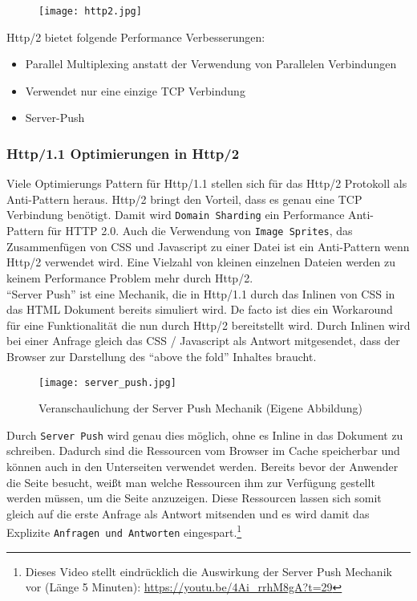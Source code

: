 		\begin{figure}[htbp]
			\begin{center}
				\texttt{[image: http2.jpg]}
				\label{fig:http2}
			\end{center}
		\end{figure}

		Http/2 bietet folgende Performance Verbesserungen:

		\begin{itemize}
			\item Parallel Multiplexing anstatt der Verwendung von Parallelen Verbindungen
			\item Verwendet nur eine einzige TCP Verbindung
			\item Server-Push
		\end{itemize}
		
		\subsubsection{Http/1.1 Optimierungen in Http/2} %
		\label{ssub:http_1_1_optimierungen_in_http_2}
			Viele Optimierungs Pattern für Http/1.1 stellen sich für das Http/2 Protokoll als Anti-Pattern heraus. Http/2 bringt den Vorteil, dass es genau eine TCP Verbindung benötigt. Damit wird \texttt{Domain Sharding} ein Performance Anti-Pattern für HTTP 2.0. Auch die Verwendung von \texttt{Image Sprites}, das Zusammenfügen von CSS und Javascript zu einer Datei ist ein Anti-Pattern wenn Http/2 verwendet wird. Eine Vielzahl von kleinen einzelnen Dateien werden zu keinem Performance Problem mehr durch Http/2.\autocite{grigorikHttp2}\\
			"`Server Push"' ist eine Mechanik, die in Http/1.1 durch das Inlinen von CSS in das HTML Dokument bereits simuliert wird. De facto ist dies ein Workaround für eine Funktionalität die nun durch Http/2 bereitstellt wird. Durch Inlinen wird bei einer Anfrage gleich das CSS / Javascript als Antwort mitgesendet, dass der Browser zur Darstellung des "`above the fold"' Inhaltes braucht.

			\begin{figure}[htbp]
				\begin{center}
					\texttt{[image: server\_push.jpg]}
					\caption{Veranschaulichung der Server Push Mechanik (Eigene Abbildung)}
					\label{fig:server_push}
				\end{center}
			\end{figure}
			
			Durch \texttt{Server Push} wird genau dies möglich, ohne es Inline in das Dokument zu schreiben. Dadurch sind die Ressourcen vom Browser im Cache speicherbar und können auch in den Unterseiten verwendet werden. Bereits bevor der Anwender die Seite besucht, weißt man welche Ressourcen ihm zur Verfügung gestellt werden müssen, um die Seite anzuzeigen. Diese Ressourcen lassen sich somit gleich auf die erste Anfrage als Antwort mitsenden und es wird damit das Explizite \texttt{Anfragen und Antworten} eingespart.\footnote{Dieses Video stellt eindrücklich die Auswirkung der Server Push Mechanik vor (Länge 5 Minuten): \url{https://youtu.be/4Ai_rrhM8gA?t=29}}\\

